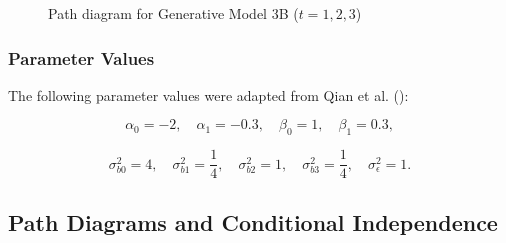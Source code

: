 \documentclass[
  12pt,
  a4paper,
]{article}
\begin{document}
\begin{figure}[H]

\caption{\label{fig-GM3B_path}Path diagram for Generative Model 3B
(\(t = 1, 2, 3\))}


\end{figure}%

\subsubsection{Parameter Values}\label{parameter-values}

The following parameter values were adapted from Qian et al.
():

\[
\alpha_0 = -2, \quad \alpha_1 = -0.3, \quad \beta_0 = 1, \quad \beta_1 = 0.3,
\]

\[
\sigma_{b0}^2 = 4, \quad \sigma_{b1}^2 = \frac{1}{4}, \quad \sigma_{b2}^2 = 1, \quad \sigma_{b3}^2 = \frac{1}{4}, \quad \sigma_\epsilon^2 = 1.
\]

\subsection{Path Diagrams and Conditional
Independence}\label{path-diagrams-and-conditional-independence}
\end{document}
